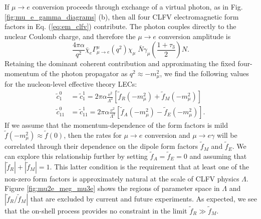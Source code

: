 \documentclass{book}[letterpaper,12pt]
\begin{document}
If $\mu\rightarrow e$ conversion proceeds through exchange of a virtual photon, as in Fig. \ref{fig:mu_e_gamma_diagrams} (b), then all four CLFV electromagnetic form factors in Eq. (\ref{eq:em_clfv}) contribute. The photon couples directly to the nuclear Coulomb charge, and therefore the $\mu\rightarrow e$ conversion amplitude is
\begin{equation}
\frac{4\pi\alpha}{q^2}\bar{\chi}_e\Gamma^{\mu}_{\mu\rightarrow e}(q^2)\chi_{\mu}\;\bar{N}\gamma_{\mu}\left(\frac{1+\tau_3}{2}\right)N.
\end{equation}
Retaining the dominant coherent contribution and approximating the fixed four-momentum of the photon propagator as $q^2\approx -m_{\mu}^2$, we find the following values for the nucleon-level effective theory LECs:
\begin{equation}
\begin{split}
\tilde{c}_1^0&=\tilde{c}_1^1=2\pi\alpha\frac{v^2}{\Lambda^2}\left[\tilde{f}_R(-m_{\mu}^2)+\tilde{f}_M(-m_{\mu}^2)\right]\\
\tilde{c}_{11}^0&=\tilde{c}_{11}^1=2\pi\alpha\frac{v^2}{\Lambda^2}\left[\tilde{f}_A(-m_{\mu}^2)-\tilde{f}_E(-m_{\mu}^2)\right].
\end{split}
\end{equation}
If we assume that the momentum-dependence of the form factors is mild $\tilde{f}(-m_{\mu}^2)\approx \tilde{f}(0)$, then the rates for $\mu\rightarrow e$ conversion and $\mu\rightarrow e\gamma$ will be correlated through their dependence on the dipole form factors $\tilde{f}_M$ and $\tilde{f}_E$. We can explore this relationship further by setting $\tilde{f}_A=\tilde{f}_E=0$ and assuming that $|\tilde{f}_R|+|\tilde{f}_M|=1$. This latter condition is the requirement that at least one of the non-zero form factors is approximately natural at the scale of CLFV physics $\Lambda$. Figure \ref{fig:mu2e_meg_mu3e} shows the regions of parameter space in $\Lambda$ and $|\tilde{f}_R/\tilde{f}_M|$ that are excluded by current and future experiments. As expected, we see that the on-shell process provides no constraint in the limit $\tilde{f}_R\gg \tilde{f}_M$. 
\end{document}
